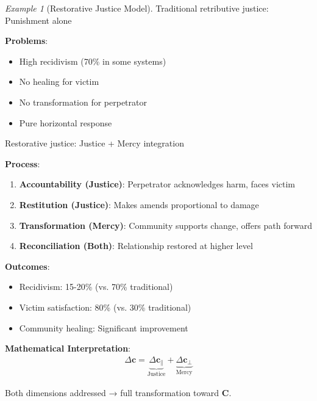 \documentclass[11pt,a4paper]{article}
\theoremstyle{definition}
\theoremstyle{remark}
\newtheorem{example}{Example}[section]
\newcommand{\cc}{\mathbf{c}}
\begin{document}
\begin{enumerate}
\begin{example}[Restorative Justice Model]
Traditional retributive justice: Punishment alone

\textbf{Problems}:
\begin{itemize}
    \item High recidivism (70\% in some systems)
    \item No healing for victim
    \item No transformation for perpetrator
    \item Pure horizontal response
\end{itemize}

Restorative justice: Justice + Mercy integration

\textbf{Process}:
\begin{enumerate}
    \item \textbf{Accountability (Justice)}: Perpetrator acknowledges harm, faces victim
    \item \textbf{Restitution (Justice)}: Makes amends proportional to damage
    \item \textbf{Transformation (Mercy)}: Community supports change, offers path forward
    \item \textbf{Reconciliation (Both)}: Relationship restored at higher level
\end{enumerate}

\textbf{Outcomes}:
\begin{itemize}
    \item Recidivism: 15-20\% (vs. 70\% traditional)
    \item Victim satisfaction: 80\% (vs. 30\% traditional)
    \item Community healing: Significant improvement
\end{itemize}

\textbf{Mathematical Interpretation}:
\begin{align}
\Delta \cc = \underbrace{\Delta \cc_{\parallel}}_{\text{Justice}} + \underbrace{\Delta \cc_{\perp}}_{\text{Mercy}}
\end{align}

Both dimensions addressed → full transformation toward \(\mathbf{C}\).
\end{example}

\begin{figure}[H]
\centering
{}
\end{figure}
\end{enumerate}
\end{document}
